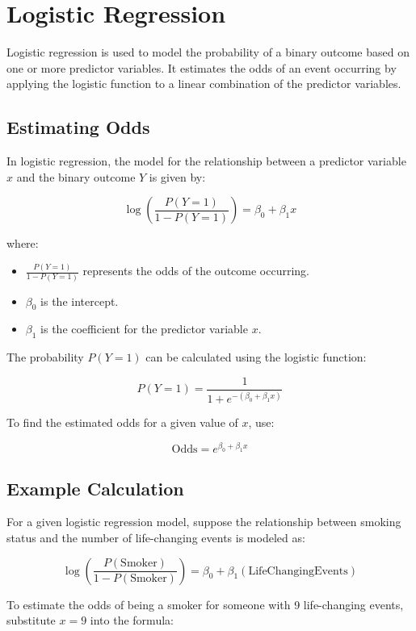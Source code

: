 \documentclass{article}
\begin{document}
\section{Logistic Regression}

Logistic regression is used to model the probability of a binary outcome based on one or more predictor variables. It estimates the odds of an event occurring by applying the logistic function to a linear combination of the predictor variables.

\subsection{Estimating Odds}

In logistic regression, the model for the relationship between a predictor variable \( x \) and the binary outcome \( Y \) is given by:

\[
\log \left( \frac{P(Y = 1)}{1 - P(Y = 1)} \right) = \beta_0 + \beta_1 x
\]

where:
\begin{itemize}
    \item \( \frac{P(Y = 1)}{1 - P(Y = 1)} \) represents the odds of the outcome occurring.
    \item \( \beta_0 \) is the intercept.
    \item \( \beta_1 \) is the coefficient for the predictor variable \( x \).
\end{itemize}

The probability \( P(Y = 1) \) can be calculated using the logistic function:

\[
P(Y = 1) = \frac{1}{1 + e^{-(\beta_0 + \beta_1 x)}}
\]

To find the estimated odds for a given value of \( x \), use:

\[
\text{Odds} = e^{\beta_0 + \beta_1 x}
\]

\subsection{Example Calculation}

For a given logistic regression model, suppose the relationship between smoking status and the number of life-changing events is modeled as:

\[
\log \left( \frac{P(\text{Smoker})}{1 - P(\text{Smoker})} \right) = \beta_0 + \beta_1 (\text{LifeChangingEvents})
\]

To estimate the odds of being a smoker for someone with 9 life-changing events, substitute \( x = 9 \) into the formula:
\end{document}

